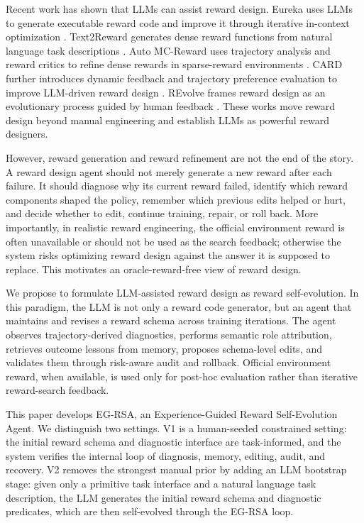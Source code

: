 \documentclass[11pt]{article}
\begin{document}
Recent work has shown that LLMs can assist reward design. Eureka uses LLMs to generate executable reward code and improve it through iterative in-context optimization \citep{ma2023eureka}. Text2Reward generates dense reward functions from natural language task descriptions \citep{xie2023text2reward}. Auto MC-Reward uses trajectory analysis and reward critics to refine dense rewards in sparse-reward environments \citep{li2023automcreward}. CARD further introduces dynamic feedback and trajectory preference evaluation to improve LLM-driven reward design \citep{sun2024card}. REvolve frames reward design as an evolutionary process guided by human feedback \citep{hazra2024revolve}. These works move reward design beyond manual engineering and establish LLMs as powerful reward designers.

However, reward generation and reward refinement are not the end of the story. A reward design agent should not merely generate a new reward after each failure. It should diagnose why its current reward failed, identify which reward components shaped the policy, remember which previous edits helped or hurt, and decide whether to edit, continue training, repair, or roll back. More importantly, in realistic reward engineering, the official environment reward is often unavailable or should not be used as the search feedback; otherwise the system risks optimizing reward design against the answer it is supposed to replace. This motivates an oracle-reward-free view of reward design.

We propose to formulate LLM-assisted reward design as reward self-evolution. In this paradigm, the LLM is not only a reward code generator, but an agent that maintains and revises a reward schema across training iterations. The agent observes trajectory-derived diagnostics, performs semantic role attribution, retrieves outcome lessons from memory, proposes schema-level edits, and validates them through risk-aware audit and rollback. Official environment reward, when available, is used only for post-hoc evaluation rather than iterative reward-search feedback.

This paper develops EG-RSA, an Experience-Guided Reward Self-Evolution Agent. We distinguish two settings. V1 is a human-seeded constrained setting: the initial reward schema and diagnostic interface are task-informed, and the system verifies the internal loop of diagnosis, memory, editing, audit, and recovery. V2 removes the strongest manual prior by adding an LLM bootstrap stage: given only a primitive task interface and a natural language task description, the LLM generates the initial reward schema and diagnostic predicates, which are then self-evolved through the EG-RSA loop.
\end{document}
